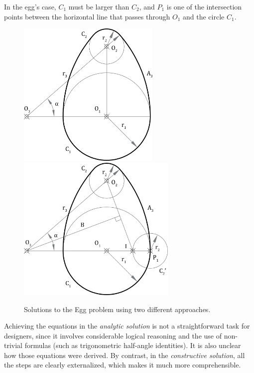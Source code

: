 In the egg's case, $C_1$ must be larger than $C_2$, and $P_1$ is one of the
intersection points between the horizontal line that passes through $O_1$ and
the circle $C_1$.

\begin{figure}[htb]
    {\includegraphics[height=7cm]{fig/egg-solution-analytic}}
  \hspace{\fill}
    {\includegraphics[height=7cm]{fig/egg-solution-constructive}}
  \caption[Egg problem solutions]{Solutions to the Egg problem using two
    different approaches.}%
  \label{fig:eval.studies.egg.sol}
\end{figure}

Achieving the equations in the \textit{analytic solution} is not a
straightforward task for designers, since it involves considerable logical
reasoning and the use of non-trivial formulas (such as trigonometric half-angle
identities). It is also unclear how those equations were derived. By contrast,
in the \textit{constructive solution}, all the steps are clearly externalized,
which makes it much more comprehensible.

